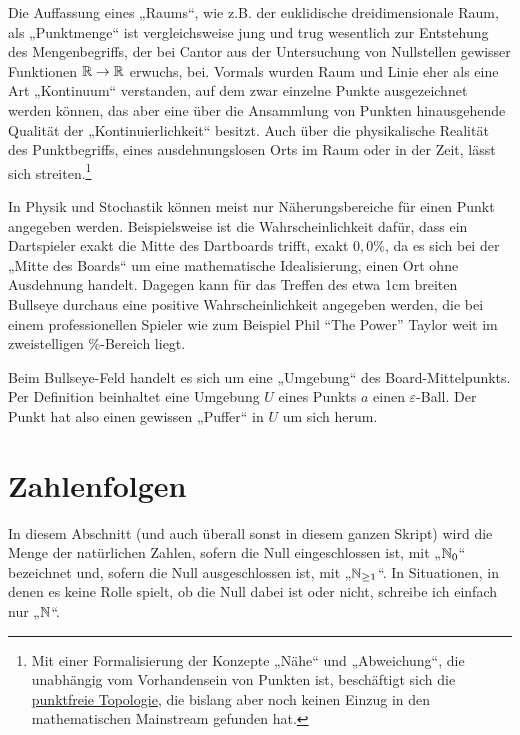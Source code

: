 \begin{bem}[Intuition]
    Die Auffassung eines „Raums“, wie z.B. der euklidische dreidimensionale Raum, als „Punktmenge“ ist vergleichsweise jung und trug wesentlich zur Entstehung des Mengenbegriffs, der bei Cantor aus der Untersuchung von Nullstellen gewisser Funktionen $\mathbb R \to \mathbb R$ erwuchs, bei. Vormals wurden Raum und Linie eher als eine Art „Kontinuum“ verstanden, auf dem zwar einzelne Punkte ausgezeichnet werden können, das aber eine über die Ansammlung von Punkten hinausgehende Qualität der „Kontinuierlichkeit“ besitzt. Auch über die physikalische Realität des Punktbegriffs, eines ausdehnungslosen Orts im Raum oder in der Zeit, lässt sich streiten.\footnote{Mit einer Formalisierung der Konzepte „Nähe“ und „Abweichung“, die unabhängig vom Vorhandensein von Punkten ist, beschäftigt sich die \href{https://en.wikipedia.org/wiki/Pointless_topology}{punktfreie Topologie}, die bislang aber noch keinen Einzug in den mathematischen Mainstream gefunden hat.}
    
    In Physik und Stochastik können meist nur Näherungsbereiche für einen Punkt angegeben werden. Beispielsweise ist die Wahrscheinlichkeit dafür, dass ein Dartspieler exakt die Mitte des Dartboards trifft, exakt $0{,}0\%$, da es sich bei der „Mitte des Boards“ um eine mathematische Idealisierung, einen Ort ohne Ausdehnung handelt. Dagegen kann für das Treffen des etwa 1cm breiten Bullseye durchaus eine positive Wahrscheinlichkeit angegeben werden, die bei einem professionellen Spieler wie zum Beispiel Phil ``The Power'' Taylor weit im zweistelligen \%-Bereich liegt.
    
    Beim Bullseye-Feld handelt es sich um eine „Umgebung“ des Board-Mittelpunkts. Per Definition beinhaltet eine Umgebung $U$ eines Punkts $a$ einen $\varepsilon$-Ball. Der Punkt hat also einen gewissen „Puffer“ in $U$ um sich herum.
\end{bem}





\section{Zahlenfolgen}


\begin{bem} \label{natzahlen}
    In diesem Abschnitt (und auch überall sonst in diesem ganzen Skript) wird die Menge der natürlichen Zahlen, sofern die Null eingeschlossen ist, mit „$\mathbb N_0$“ bezeichnet und, sofern die Null ausgeschlossen ist, mit „$\mathbb N_{\ge 1}$“. In Situationen, in denen es keine Rolle spielt, ob die Null dabei ist oder nicht, schreibe ich einfach nur „$\mathbb N$“.
\end{bem}


